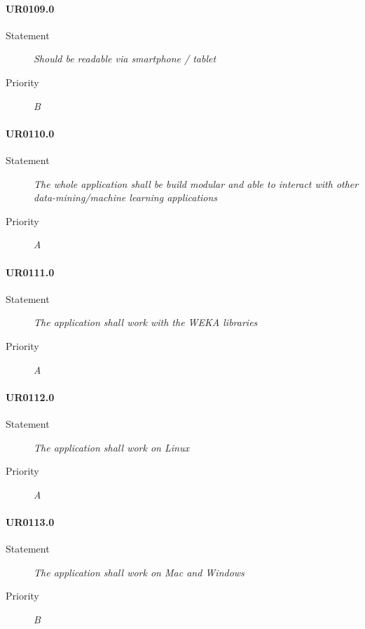 \paragraph{UR0109.0}
\begin{description}
\item [Statement] \textit{
Should be readable via smartphone / tablet
}
\item [Priority] \textit{B}
\end{description}

\paragraph{UR0110.0}
\begin{description}
\item [Statement] \textit{
The whole application shall be build modular and able to interact with other data-mining/machine learning applications 
}
\item [Priority] \textit{A}
\end{description}

\paragraph{UR0111.0}
\begin{description}
\item [Statement] \textit{
The application shall work with the \gls{WEKA} libraries
}
\item [Priority] \textit{A}
\end{description}

\paragraph{UR0112.0}
\begin{description}
\item [Statement] \textit{
The application shall work on \gls{Linux}
}
\item [Priority] \textit{A}
\end{description}

\paragraph{UR0113.0}
\begin{description}
\item [Statement] \textit{
The application shall work on \gls{Mac} and \gls{Windows}
}
\item [Priority] \textit{B}
\end{description}

